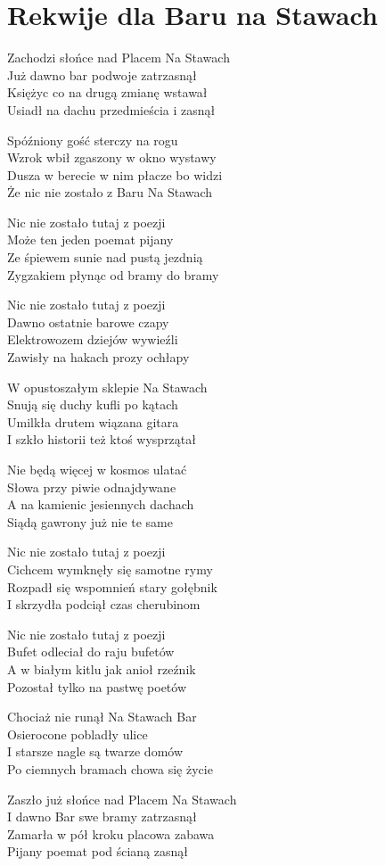 \section{Rekwije dla Baru na Stawach}
\begin{text}
Zachodzi słońce nad Placem Na Stawach\\
Już dawno bar podwoje zatrzasnął\\
Księżyc co na drugą zmianę wstawał\\
Usiadł na dachu przedmieścia i zasnął

Spóźniony gość sterczy na rogu\\
Wzrok wbił zgaszony w okno wystawy\\
Dusza w berecie w nim płacze bo widzi\\
Że nic nie zostało z Baru Na Stawach

Nic nie zostało tutaj z poezji\\
Może ten jeden poemat pijany\\
Ze śpiewem sunie nad pustą jezdnią\\
Zygzakiem płynąc od bramy do bramy

Nic nie zostało tutaj z poezji\\
Dawno ostatnie barowe czapy\\
Elektrowozem dziejów wywieźli\\
Zawisły na hakach prozy ochłapy

\hfill\break
W opustoszałym sklepie Na Stawach\\
Snują się duchy kufli po kątach\\
Umilkła drutem wiązana gitara\\
I szkło historii też ktoś wysprzątał

Nie będą więcej w kosmos ulatać\\
Słowa przy piwie odnajdywane\\
A na kamienic jesiennych dachach\\
Siądą gawrony już nie te same

Nic nie zostało tutaj z poezji\\
Cichcem wymknęły się samotne rymy\\
Rozpadł się wspomnień stary gołębnik\\
I skrzydła podciął czas cherubinom

Nic nie zostało tutaj z poezji\\
Bufet odleciał do raju bufetów\\
A w białym kitlu jak anioł rzeźnik\\
Pozostał tylko na pastwę poetów

Chociaż nie runął Na Stawach Bar\\
Osierocone pobladły ulice\\
I starsze nagle są twarze domów\\
Po ciemnych bramach chowa się życie

Zaszło już słońce nad Placem Na Stawach\\
I dawno Bar swe bramy zatrzasnął\\
Zamarła w pół kroku placowa zabawa\\
Pijany poemat pod ścianą zasnął
\end{text}
